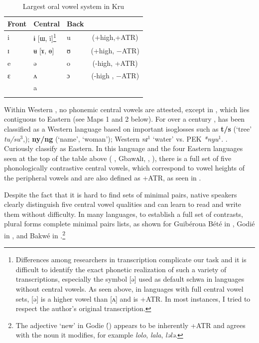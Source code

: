 \documentclass[output=paper,newtxmath,modfonts,nonflat]{langsci/langscibook}
\begin{document}
\begin{table}[b]
\begin{tabularx}{\textwidth}{XXXc}
\lsptoprule
Front & Central & Back\\
\midrule
i  &  ɨ [ɯ, ï]\footnote{Differences among researchers in transcription complicate our task and it is difficult to identify the exact phonetic realization of such a variety of transcriptions, especially the symbol [ə] used as default schwa in languages without central vowels. As seen above, in languages with full central vowel sets, [ə] is a higher vowel than [ʌ] and is +ATR. In most instances, I tried to respect the author’s original transcription.} & u  &  (+high,+ATR)\\

ɪ  &  ʉ [ɤ, ɵ]  & ʊ  &  (+high, −ATR) \\

e  &  ə  &  o  &  (-high, +ATR)\\

ɛ  &  ʌ  &  ɔ  &  (-high , −ATR) \\

& a\\
\lspbottomrule
\end{tabularx}	
\caption{Largest oral vowel system in Kru}
\label{tab:zogbo:5}
\end{table}
\largerpage[2]
Within Western , no phonemic central vowels are attested, except in , which lies contiguous to Eastern  (see Maps 1 and 2 below).  For over a century \citep{Delafosse1904},  has been classified as a Western  language based on important isoglosses such as \textbf{t/s} (‘tree’ \textit{tu/su$^3$},); \textbf{ny/ng} (‘name’, ‘woman’); Western \textit{nɪ}$^1$ ‘water’ vs. PEK \textit{*nyu}$^1$. \citep{Marchese1989}.  Curiously \citet{lewisetal2014} classify  as Eastern. In this language and the four Eastern languages seen at the top of the table above ( , Gbawʌlɪ, , ), 
\largerpage[2]
there is a full set of five phonologically contrastive central vowels, which correspond to vowel heights of the peripheral vowels and are also defined as +ATR, as seen in .



Despite the fact that it is hard to find  sets of minimal pairs, native speakers clearly distinguish five central vowel qualities and can learn to read and write them without difficulty. In many languages, to establish a full set of contrasts, plural forms complete minimal pairs lists, as shown for Guibéroua Bété in , Godié in , and Bakwé in .\footnote{The adjective ‘new’ in Godie (́) appears to be inherently +ATR and agrees with the noun it modifies, for example \textit{lolo}, \textit{lala}, \textit{lələ}.}
 
\end{document}
